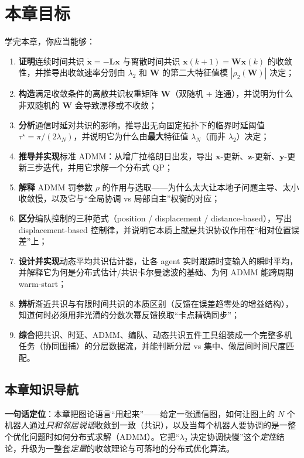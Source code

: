 \section*{本章目标}
学完本章，你应当能够：
\begin{enumerate}
  \item \textbf{证明}连续时间共识 $\dot{\mathbf{x}}=-\mathbf{L}\mathbf{x}$ 与离散时间共识 $\mathbf{x}(k{+}1)=\mathbf{W}\mathbf{x}(k)$ 的收敛性，并推导出收敛速率分别由 $\lambda_2$ 和 $\mathbf{W}$ 的第二大特征值模 $|\rho_2(\mathbf{W})|$ 决定；
  \item \textbf{构造}满足收敛条件的离散共识权重矩阵 $\mathbf{W}$（双随机 + 连通），并说明为什么非双随机的 $\mathbf{W}$ 会导致漂移或不收敛；
  \item \textbf{分析}通信时延对共识的影响，推导出无向固定拓扑下的临界时延阈值 $\tau^\star=\pi/(2\lambda_N)$，并说明它为什么由\textbf{最大}特征值 $\lambda_N$（而非 $\lambda_2$）决定；
  \item \textbf{推导并实现}标准 ADMM：从增广拉格朗日出发，导出 $\mathbf{x}$-更新、$\mathbf{z}$-更新、$\mathbf{y}$-更新三步迭代，并用它求解一个分布式 QP；
  \item \textbf{解释} ADMM 罚参数 $\rho$ 的作用与选取——为什么太大让本地子问题主导、太小收敛慢，以及它与“全局协调 vs 局部自主”权衡的对应；
  \item \textbf{区分}编队控制的三种范式（position / displacement / distance-based），写出 displacement-based 控制律，并说明它本质上就是共识协议作用在“相对位置误差”上；
  \item \textbf{设计并实现}动态平均共识估计器，让各 agent 实时跟踪时变输入的瞬时平均，并解释它为何是分布式估计/共识卡尔曼滤波的基础、为何 ADMM 能跨周期 warm-start；
  \item \textbf{辨析}渐近共识与有限时间共识的本质区别（反馈在误差趋零处的增益结构），知道何时必须用非光滑的分数次幂反馈换取“卡点精确同步”；
  \item \textbf{综合}把共识、时延、ADMM、编队、动态共识五件工具组装成一个完整多机任务（协同围捕）的分层数据流，并能判断分层 vs 集中、做层间时间尺度匹配。
\end{enumerate}

\subsection*{本章知识导航}
\textbf{一句话定位}：本章把图论语言“用起来”——给定一张通信图，如何让图上的 $N$ 个机器人通过\emph{只和邻居说话}收敛到一致（共识），以及当每个机器人要协调的是一整个优化问题时如何分布式求解（ADMM）。它把“$\lambda_2$ 决定协调快慢”这个\emph{定性}结论，升级为一整套\emph{定量}的收敛理论与可落地的分布式优化算法。

